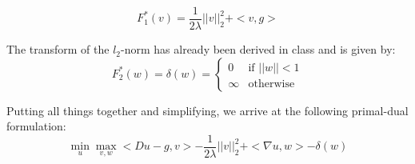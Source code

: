 \documentclass{paper}
\begin{document}
\begin{enumerate}
\begin{equation}
F_1^*(v) = \frac{1}{2\lambda}||v||_2^2+<v,g>
\end{equation}         

The transform of the $l_2$-norm has already been derived in class and is given by:
\[
F_2^*(w) = \delta(w) = 
  \begin{cases}
   0 & \text{if } ||w|| < 1 \\
   \infty       & \text{otherwise}
  \end{cases}
\]

Putting all things together and simplifying, we arrive at the following primal-dual formulation:
\begin{equation}
\min_u \max_{v,w} <Du-g,v> - \frac{1}{2\lambda}||v||_2^2 + <\nabla u,w>-\delta(w)
\end{equation}    


\end{enumerate}
\end{document}
